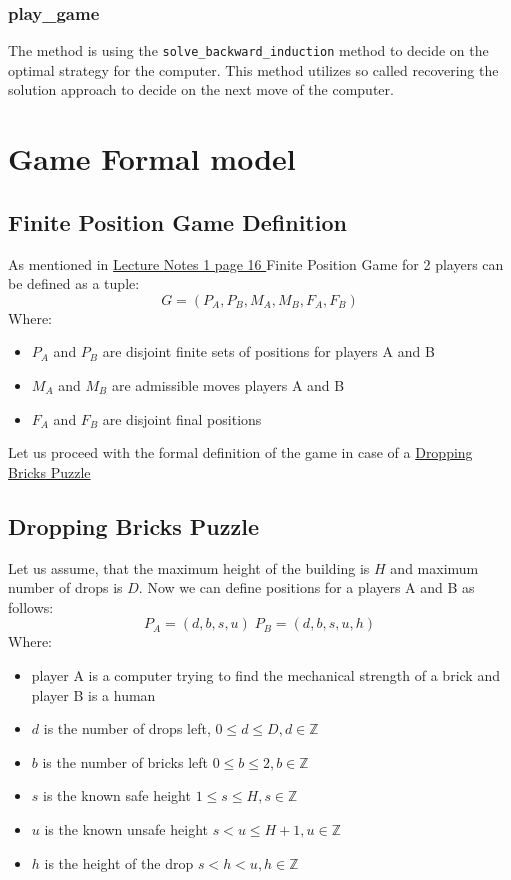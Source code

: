 \documentclass{article}
\begin{document}
\subsubsection{play\_game}
The method is using the \verb|solve_backward_induction| method to decide on the
optimal strategy for the computer. This method utilizes so called recovering
the solution approach to decide on the next move of the computer.

\section{Game Formal model}

\subsection{Finite Position Game Definition}

As mentioned in \href{
    https://moodle.innopolis.university/pluginfile.php/193734/mod_resource/content/2/GT1spr24.pdf#page=16}{
    Lecture Notes 1 page 16 } Finite Position Game for 2 players can be defined as
a tuple:
\[
    G = (P_A, P_B, M_A, M_B, F_A, F_B)
\]
Where:
\begin{itemize}
    \item $P_A$ and $P_B$ are disjoint finite sets of positions for players A and B
    \item $M_A$ and $M_B$ are admissible moves players A and B
    \item $F_A$ and $F_B$ are disjoint final positions
\end{itemize}

Let us proceed with the formal definition of the game in case of a
\href{https://moodle.innopolis.university/pluginfile.php/193734/mod_resource/content/2/GT1spr24.pdf#page=36}{Dropping
    Bricks Puzzle}

\subsection{Dropping Bricks Puzzle}

Let us assume, that the maximum height of the building is $H$ and maximum
number of drops is $D$. Now we can define positions for a players A and B as
follows:
\[
    P_A = (d, b, s, u) \;  P_B = (d, b, s, u, h)
\]
Where:
\begin{itemize}
    \item player A is a computer trying to find the mechanical strength of a brick and
          player B is a human

    \item $d$ is the number of drops left, $0 \leq d \leq D, d \in \mathbb{Z}$
    \item $b$ is the number of bricks left $0 \leq b \leq 2, b \in \mathbb{Z}$
    \item $s$ is the known safe height $1 \leq s \leq H, s \in \mathbb{Z}$
    \item $u$ is the known unsafe height $s < u \leq H + 1, u \in \mathbb{Z}$
    \item $h$ is the height of the drop $s < h < u, h \in \mathbb{Z}$
\end{itemize}
\end{document}
